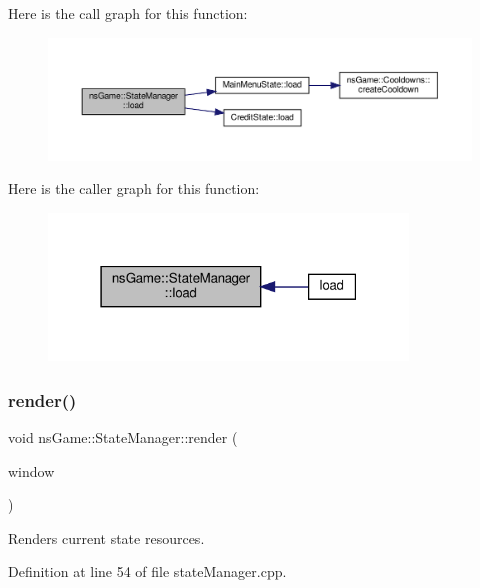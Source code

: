 Here is the call graph for this function\+:\nopagebreak
\begin{figure}[H]
\begin{center}
\leavevmode
\includegraphics[width=350pt]{classns_game_1_1_state_manager_a337170555d3a9a71cbc16c30a8364981_cgraph}
\end{center}
\end{figure}
Here is the caller graph for this function\+:\nopagebreak
\begin{figure}[H]
\begin{center}
\leavevmode
\includegraphics[width=271pt]{classns_game_1_1_state_manager_a337170555d3a9a71cbc16c30a8364981_icgraph}
\end{center}
\end{figure}
\mbox{\label{classns_game_1_1_state_manager_a6f5b564dbd4e84529a125aca38f4339d}} 
\subsubsection{\texorpdfstring{render()}{render()}}
{\footnotesize\ttfamily void ns\+Game\+::\+State\+Manager\+::render (\begin{DoxyParamCaption}\item[{Min\+GL \&}]{window }\end{DoxyParamCaption})}



Renders current state resources. 



Definition at line 54 of file state\+Manager.\+cpp.

